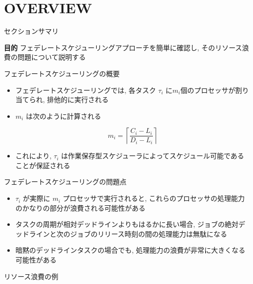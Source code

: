 
\section{OVERVIEW}
\label{sec: overview}

\begin{frame}{セクションサマリ}
    \begin{itembox}[l]{\textbf{目的}}
        フェデレートスケジューリングアプローチを簡単に確認し, そのリソース浪費の問題について説明する
    \end{itembox}
\end{frame}

\begin{frame}{フェデレートスケジューリングの概要}
    \begin{itemize}
        \item フェデレートスケジューリングでは, 各タスク $\tau_{i}$ に$m_{i}$個のプロセッサが割り当てられ, 排他的に実行される
        \item $m_{i}$ は次のように計算される

              \begin{equation*}
                  m_{i}=\left\lceil\frac{C_{i}-L_{i}}{D_{i}-L_{i}}\right\rceil
              \end{equation*}

        \item これにより, $\tau_{i}$ は作業保存型スケジューラによってスケジュール可能であることが保証される
    \end{itemize}
\end{frame}

\begin{frame}{フェデレートスケジューリングの問題点}
    \begin{itemize}
        \item $\tau_{i}$ が実際に $m_{i}$ プロセッサで実行されると, これらのプロセッサの処理能力のかなりの部分が浪費される可能性がある
        \item タスクの周期が相対デッドラインよりもはるかに長い場合, ジョブの絶対デッドラインと次のジョブのリリース時刻の間の処理能力は無駄になる
        \item 暗黙のデッドラインタスクの場合でも, 処理能力の浪費が非常に大きくなる可能性がある
    \end{itemize}
\end{frame}

\begin{frame}{リソース浪費の例}
\end{frame}

